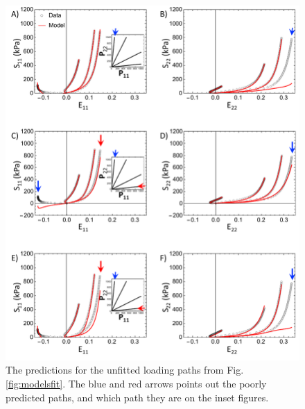 \begin{figure}[!hbtp]
\centering
\includegraphics[width=\textwidth]{Images/chapter5/modelspred}
\caption{The predictions for the unfitted loading paths from Fig. \ref{fig:modelsfit}. The blue and red arrows points out the poorly predicted paths, and which path they are on the inset figures.}
\label{fig:modelspred}
\end{figure} 


